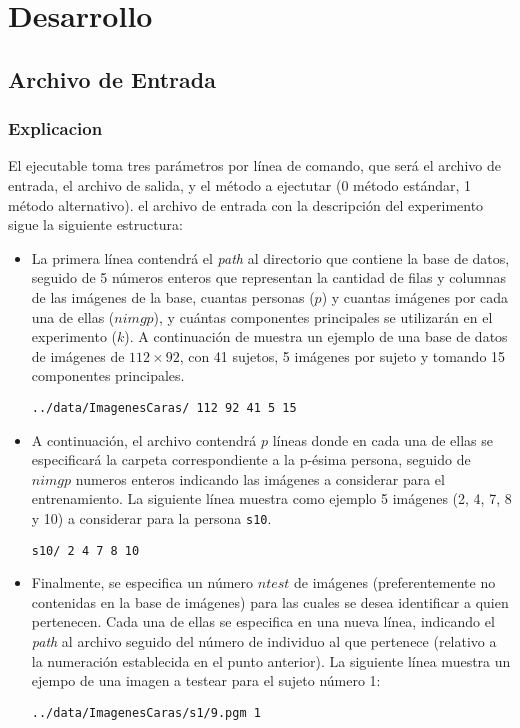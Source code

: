 \section{Desarrollo}
\subsection{Archivo de Entrada}
\subsubsection{Explicacion}
El ejecutable toma tres par\'ametros por l\'inea de comando, que ser\'a el archivo de entrada, el archivo de salida, y el m\'etodo a
ejectutar (0 m\'etodo est\'andar, 1 m\'etodo alternativo).
el archivo de entrada con la descripci\'on del experimento sigue la siguiente
estructura:
\begin{itemize}
\item La primera l\'inea contendr\'a el \emph{path} al directorio que contiene la base de datos, seguido de 5 n\'umeros
enteros que representan la cantidad de filas y columnas de las im\'agenes de la base, cuantas personas ($p$) y cuantas
im\'agenes por cada una de ellas ($nimgp$), y cu\'antas componentes principales se utilizar\'an en el experimento ($k$). 
A continuaci\'on de muestra un ejemplo de una base de datos de im\'agenes de $112 \times 92$, con 41 sujetos, 5 
im\'agenes por sujeto y tomando 15 componentes principales.

\begin{verbatim}
../data/ImagenesCaras/ 112 92 41 5 15
\end{verbatim}

\item A continuaci\'on, el archivo contendr\'a $p$ l\'ineas donde en cada una de ellas se especificar\'a la carpeta
correspondiente a la p-\'esima persona, seguido de $nimgp$ numeros enteros indicando las im\'agenes a considerar para el
entrenamiento. La siguiente l\'inea muestra como ejemplo 5 im\'agenes (2, 4, 7, 8 y 10) a considerar para la persona
\verb+s10+.

\begin{verbatim}
s10/ 2 4 7 8 10
\end{verbatim}

\item Finalmente, se especifica un n\'umero $ntest$ de im\'agenes (preferentemente no contenidas en la base de
im\'agenes) para las cuales se desea identificar a quien pertenecen. Cada una de ellas se especifica en una nueva
l\'inea, indicando el \emph{path} al archivo seguido del n\'umero de individuo al que pertenece (relativo a la
numeraci\'on establecida en el punto anterior). La siguiente l\'inea muestra un ejempo de una imagen a testear para el
sujeto n\'umero 1:

\begin{verbatim}
../data/ImagenesCaras/s1/9.pgm 1
\end{verbatim}
\end{itemize}

